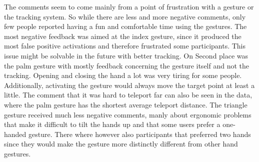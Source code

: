 \begin{landscape}
    \begin{table}[]
\label{tbl:interview}
\end{table}
\end{landscape}

The comments seem to come mainly from a point of frustration with a gesture or the tracking system. So while there are less and more negative comments, only few people reported having a fun and comfortable time using the gestures. The most negative feedback was aimed at the index gesture, since it produced the most false positive activations and therefore frustrated some participants. This issue might be solvable in the future with better tracking. On Second place was the palm gesture with mostly feedback concerning the gesture itself and not the tracking. Opening and closing the hand a lot was very tiring for some people. Additionally, activating the gesture would always move the target point at least a little. The comment that it was hard to teleport far can also be seen in the data, where the palm gesture has the shortest average teleport distance. The triangle gesture received much less negative comments, manly about ergonomic problems that make it difficult to tilt the hands up and that some users prefer a one-handed gesture. There where however also participants that preferred two hands since they would make the gesture more distinctly different from other hand gestures. 


